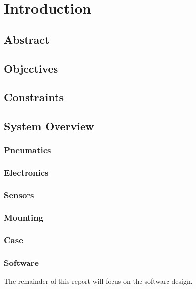 \chapter{Introduction}

\section*{Abstract}

\section{Objectives}

\section{Constraints}

\section{System Overview}


\subsection{Pneumatics}
\subsection{Electronics}
\subsection{Sensors}
\subsection{Mounting}
\subsection{Case}
\subsection{Software}

The remainder of this report will focus on the software design.
